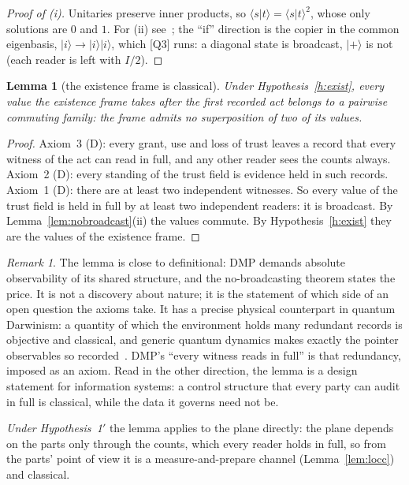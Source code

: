 \documentclass[11pt,a4paper]{article}
\newtheorem{lemma}{Lemma}
\theoremstyle{definition}
\theoremstyle{remark}
\newtheorem{remark}{Remark}
\newcommand{\chk}[1]{\textsf{[#1]}}
\newcommand{\tagD}{\textsf{(D)}}
\newcommand{\ket}[1]{\lvert #1\rangle}
\newcommand{\vtag}{{\color{newc}\textsf{\scriptsize[v5.1]}}}
\newenvironment{vnew}{\color{newc}}{}
\theoremstyle{definition}
\begin{document}
\begin{proof}[Proof of (i)]
Unitaries preserve inner products, so $\langle s|t\rangle=\langle s|t\rangle^2$, whose only solutions are $0$ and $1$. For (ii) see~\cite{barnum};
the ``if'' direction is the copier in the common eigenbasis, $\ket i\to\ket i\ket i$, which \chk{Q3} runs: a diagonal state is broadcast,
$\ket+$ is not (each reader is left with $I/2$).
\end{proof}

\begin{lemma}[the existence frame is classical]\label{lem:classical}
Under Hypothesis~\ref{h:exist}, every value the existence frame takes after the first recorded act belongs to a pairwise commuting family:
the frame admits no superposition of two of its values.
\end{lemma}

\begin{proof}
Axiom~3 \tagD: every grant, use and loss of trust leaves a record that every witness of the act can read in full, and any other reader sees
the counts always. Axiom~2 \tagD: every standing of the trust field is evidence held in such records. Axiom~1 \tagD: there are at least two
independent witnesses. So every value of the trust field is held in full by at least two independent readers: it is broadcast. By
Lemma~\ref{lem:nobroadcast}(ii) the values commute. By Hypothesis~\ref{h:exist} they are the values of the existence frame.
\end{proof}

\begin{remark}
The lemma is close to definitional: DMP demands absolute observability of its shared structure, and the no-broadcasting theorem states the
price. It is not a discovery about nature; it is the statement of which side of an open question the axioms take. It has a precise physical
counterpart in quantum Darwinism: a quantity of which the environment holds many redundant records is objective and classical, and generic
quantum dynamics makes exactly the pointer observables so recorded~\cite{zurek,bph}. DMP's ``every witness reads in full'' is that
redundancy, imposed as an axiom. Read in the other direction, the lemma is a design statement for information systems: a control structure
that every party can audit in full is classical, while the data it governs need not be.
\end{remark}

\begin{vnew}
\noindent\vtag{} \emph{Under Hypothesis~1$'$} the lemma applies to the plane directly: the plane depends on the parts only through the
counts, which every reader holds in full, so from the parts' point of view it is a measure-and-prepare channel (Lemma~\ref{lem:locc}) and
classical.
\end{vnew}
\end{document}
